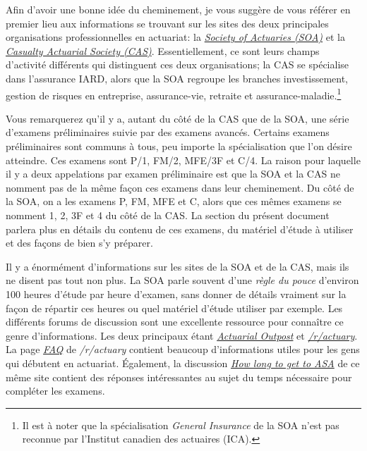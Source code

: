 \documentclass[11pt,french]{article}
\begin{document}
Afin d'avoir une bonne idée du cheminement, je vous suggère de vous référer en premier lieu aux informations se trouvant sur les sites des deux principales organisations professionnelles en actuariat: la \href{https://soa.org/member/}{\emph{Society of Actuaries (SOA)}} et la \href{http://www.casact.org/}{\emph{Casualty Actuarial Society (CAS)}}. Essentiellement, ce sont leurs champs d'activité différents qui distinguent ces deux organisations; la CAS se spécialise dans l'assurance IARD, alors que la SOA regroupe les branches investissement, gestion de risques en entreprise, assurance-vie, retraite et assurance-maladie.\footnote{ Il est à noter que la spécialisation \emph{General Insurance} de la SOA n'est pas reconnue par l'Institut canadien des actuaires (ICA).}\vspace{\baselineskip}

Vous remarquerez qu'il y a, autant du côté de la CAS que de la SOA, une série d'examens préliminaires suivie par des examens avancés. Certains examens préliminaires sont communs à tous, peu importe la spécialisation que l'on désire atteindre. Ces examens sont P/1, FM/2, MFE/3F et C/4. La raison pour laquelle il y a deux appelations par examen préliminaire est que la SOA et la CAS ne nomment pas de la même façon ces examens dans leur cheminement. Du côté de la SOA, on a les examens P, FM, MFE et C, alors que ces mêmes examens se nomment 1, 2, 3F et 4 du côté de la CAS. La section  du présent document parlera plus en détails du contenu de ces examens, du matériel d'étude à utiliser et des façons de bien s'y préparer.\vspace{\baselineskip}

Il y a énormément d'informations sur les sites de la SOA et de la CAS, mais ils ne disent pas tout non plus. La SOA parle souvent  d'une \emph{règle du pouce} d'environ 100 heures d'étude par heure d'examen, sans donner de détails vraiment sur la façon de répartir ces heures ou quel matériel d'étude utiliser par exemple. Les différents forums de discussion sont une excellente ressource pour connaître ce genre d'informations. Les deux principaux étant \href{http://www.actuarialoutpost.com/}{\emph{Actuarial Outpost}} et \href{https://www.reddit.com/r/actuary}{\emph{/r/actuary}}. La page \href{https://www.reddit.com/r/actuary/wiki/index#wiki_the_frequently_asked_questions_.28faqs.29}{\emph{FAQ}} de \emph{/r/actuary} contient beaucoup d'informations utiles pour les gens qui débutent en actuariat. Également, la discussion \href{https://www.reddit.com/r/actuary/comments/1enzdd/how_long_to_get_to_asa_is_two_years_possible/}{\emph{How long to get to ASA}} de ce même site contient des réponses intéressantes au sujet du temps nécessaire pour compléter les examens. \vspace{\baselineskip}
\end{document}
